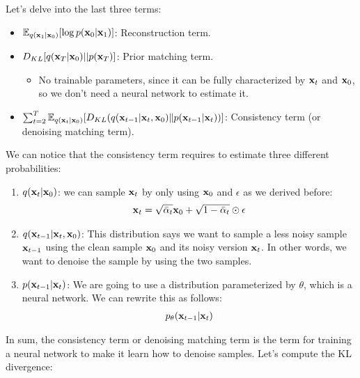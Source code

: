 Let's delve into the last three terms:
\begin{itemize}
	\item $\mathbb{E}_{q({\mathbf{x}}_{1}|{\mathbf{x}}_0)}[\log p({\mathbf{x}}_0|{\mathbf{x}}_{1})]$: Reconstruction term. 
	\item $D_{KL} [ q({\mathbf{x}}_{T}|{\mathbf{x}}_0)||p({\mathbf{x}}_T) ]$: Prior matching term.
		\begin{itemize}
			\item No trainable parameters, since it can be fully characterized by ${\mathbf{x}}_t$ and ${\mathbf{x}}_0$, so we don't need a neural network to estimate it. 
		\end{itemize}
	\item $\sum_{t=2}^{T}\mathbb{E}_{q({\mathbf{x}}_{t}|{\mathbf{x}}_0)}[D_{KL}(q({\mathbf{x}}_{t-1}|{\mathbf{x}}_t, {\mathbf{x}}_0)\|p({\mathbf{x}}_{t-1}|{\mathbf{x}}_{t}))]$: Consistency term (or denoising matching term).
\end{itemize}
We can notice that the consistency term requires to estimate three different probabilities:
\begin{enumerate}
	\item $q({\mathbf{x}}_{t}|{\mathbf{x}}_0)$: we can sample ${\mathbf{x}}_t$ by only using ${\mathbf{x}}_0$ and $\epsilon$ as we derived before: 
		\begin{align*}
			{\mathbf{x}}_t = \sqrt{\bar{\alpha}_t} \mathbf{x}_{0}+ \sqrt{1-\bar{\alpha}_t} \odot \epsilon
		\end{align*}
	\item $q({\mathbf{x}}_{t-1}|{\mathbf{x}}_t, {\mathbf{x}}_0)$: This distribution says we want to sample a less noisy sample ${\mathbf{x}}_{t-1}$ using the clean sample ${\mathbf{x}}_0$ and its noisy version ${\mathbf{x}}_t$. In other words, we want to denoise the sample by using the two samples. 
	\item $p({\mathbf{x}}_{t-1}|{\mathbf{x}}_{t})$: We are going to use a distribution parameterized by $\theta$, which is a neural network. We can rewrite this as follows:
		\begin{align*}
			p_\theta({\mathbf{x}}_{t-1}|{\mathbf{x}}_{t})
		\end{align*}
\end{enumerate}
In sum, the consistency term or denoising matching term is the term for training a neural network to make it learn how to denoise samples. Let's compute the KL divergence:

